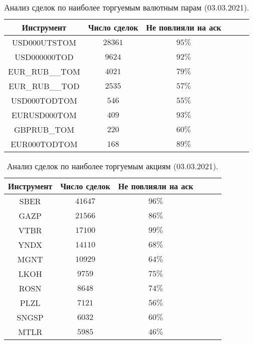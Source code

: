 \begin{table}[h!]
    \begin{center}
        \begin{tabular}{|c|c|c|c|c|c|}
            \hline
        Инструмент        & Число сделок & Не повлияли на аск  %
        \\ \hline
        USD000UTSTOM    & $28361$ &    $95\%$ %
        \\ \hline
        USD000000TOD    & $9624$ &     $92\%$ %
        \\ \hline
        EUR\_RUB\_\_TOM & $4021$ &  $79\%$ %
        \\ \hline
        EUR\_RUB\_\_TOD & $2535$ &  $57\%$ %
        \\ \hline
        USD000TODTOM    & $546$ &      $55\%$ %
        \\ \hline
        EURUSD000TOM    & $409$ &      $93\%$ %
        \\ \hline
        GBPRUB\_TOM     & $220$ &       $60\%$ %
        \\ \hline
        EUR000TODTOM    & $168$ &      $89\%$ %
          \\ \hline
        \end{tabular}
    \end{center}
    \caption{Анализ сделок по наиболее торгуемым валютным парам (03.03.2021).}
    \label{tableanalCUnew}
\end{table} 

\begin{table}[h!]
    \begin{center}
        \begin{tabular}{|c|c|c|c|c|c|}
            \hline
        Инструмент   & Число сделок & Не повлияли на аск %
        \\ \hline
        SBER &  $41647$  & $ 96\% $ %
        \\ \hline
        GAZP &  $21566$  & $ 86\% $ %
        \\ \hline
        VTBR &  $17100$  & $ 99\% $ %
         \\ \hline
        YNDX &  $14110$  & $ 68\% $ %
        \\ \hline
        MGNT &  $10929$  & $ 64\% $ %
        \\ \hline
        LKOH &  $9759 $ &  $ 75\% $ %
        \\ \hline
        ROSN &  $8648 $ &  $ 74\% $ %
         \\ \hline
        PLZL &  $7121 $ &  $ 56\% $ %
        \\ \hline
        SNGSP & $ 6032$  & $ 60\% $ %
        \\ \hline
        MTLR &  $5985 $ &  $ 46\% $ %
        \\ \hline
        \end{tabular}
    \end{center}
    \caption{Анализ сделок по наиболее торгуемым акциям (03.03.2021).}
    \label{tableanalSE}
\end{table} 
